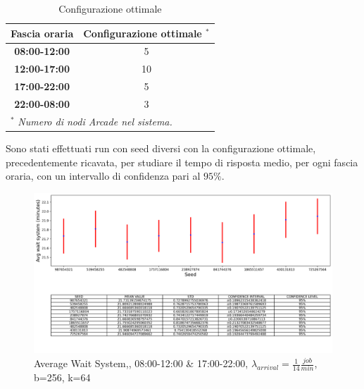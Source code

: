 \documentclass{article}
\begin{document}
\begin{table}[htbp]
\caption{Configurazione ottimale}
\begin{center}
\begin{tabular}{|c|c|}
\hline
\textbf{Fascia oraria} & \textbf{Configurazione ottimale $^{\mathrm{*}}$} \\ \hline
\textbf{08:00-12:00}  & 5 \\ \hline
\textbf{12:00-17:00}  & 10 \\ \hline
\textbf{17:00-22:00}  & 5 \\ \hline
\textbf{22:00-08:00} & 3 \\ \hline
\multicolumn{2}{l}{$^{\mathrm{*}}$ \textit{Numero di nodi Arcade nel sistema.}}
\end{tabular}
\label{tab3}
\end{center}
\end{table}
Sono stati effettuati run con seed diversi con la configurazione ottimale, precedentemente ricavata, per studiare il tempo di risposta medio, per ogni fascia oraria, con un intervallo di confidenza pari al $95\%$.

\begin{figure}[H]
	\centering
	\captionsetup{justification=centering,margin=2cm}
	\includegraphics[scale=0.48]{images/avg_ws_steady_state_mor.png}
	\caption{Average Wait System,, 08:00-12:00 \& 17:00-22:00, $\lambda_{arrival}=\frac{1}{14} \frac{job}{min}$, b=256, k=64}\label{figura:avg_ws_steady_state_mor}
\end{figure}
\end{document}
